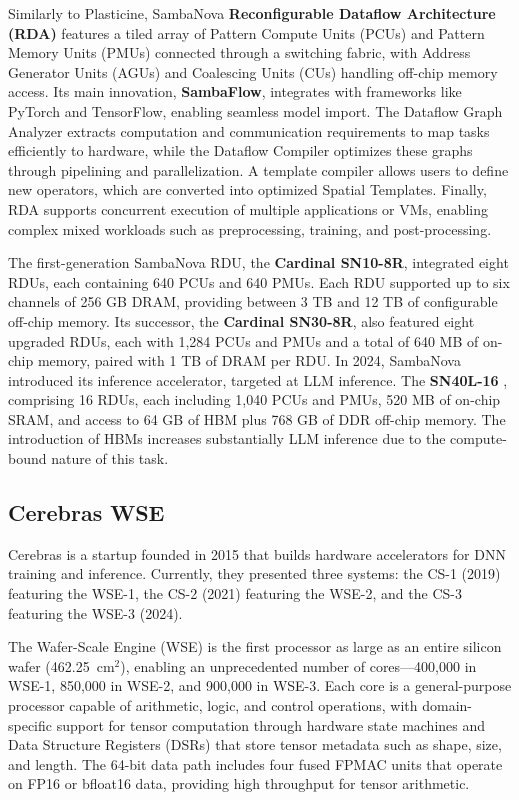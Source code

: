 Similarly to Plasticine, SambaNova \textbf{Reconfigurable Dataflow Architecture (RDA)} \cite{sambanova} features a tiled array of Pattern Compute Units (PCUs) and Pattern Memory Units (PMUs) connected through a switching fabric, with Address Generator Units (AGUs) and Coalescing Units (CUs) handling off-chip memory access. Its main innovation, \textbf{SambaFlow}, integrates with frameworks like PyTorch and TensorFlow, enabling seamless model import. The Dataflow Graph Analyzer extracts computation and communication requirements to map tasks efficiently to hardware, while the Dataflow Compiler optimizes these graphs through pipelining and parallelization. A template compiler allows users to define new operators, which are converted into optimized Spatial Templates. Finally, RDA supports concurrent execution of multiple applications or VMs, enabling complex mixed workloads such as preprocessing, training, and post-processing.

The first-generation SambaNova RDU, the \textbf{Cardinal SN10-8R}, integrated eight RDUs, each containing 640 PCUs and 640 PMUs. Each RDU supported up to six channels of 256 GB DRAM, providing between 3 TB and 12 TB of configurable off-chip memory. Its successor, the \textbf{Cardinal SN30-8R}, also featured eight upgraded RDUs, each with 1,284 PCUs and PMUs and a total of 640 MB of on-chip memory, paired with 1 TB of DRAM per RDU. In 2024, SambaNova introduced its inference accelerator, targeted at LLM inference. The \textbf{SN40L-16} \cite{Prabhakar2024}, comprising 16 RDUs, each including 1,040 PCUs and PMUs, 520 MB of on-chip SRAM, and access to 64 GB of HBM plus 768 GB of DDR off-chip memory. The introduction of HBMs increases substantially LLM inference due to the compute-bound nature of this task.

\subsection{Cerebras WSE}
Cerebras is a startup founded in 2015 that builds hardware accelerators for DNN training and inference. Currently, they presented three systems: the CS-1 (2019) featuring the WSE-1, the CS-2 (2021) featuring the WSE-2, and the CS-3 featuring the WSE-3 (2024).

The Wafer-Scale Engine (WSE) is the first processor as large as an entire silicon wafer (462.25~cm$^2$), enabling an unprecedented number of cores—400{,}000 in WSE-1, 850{,}000 in WSE-2, and 900{,}000 in WSE-3. Each core is a general-purpose processor capable of arithmetic, logic, and control operations, with domain-specific support for tensor computation through hardware state machines and Data Structure Registers (DSRs) that store tensor metadata such as shape, size, and length. The 64-bit data path includes four fused FPMAC units that operate on FP16 or bfloat16 data, providing high throughput for tensor arithmetic.

